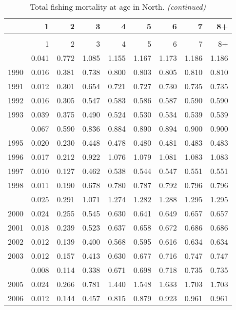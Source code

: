 \documentclass[
]{article}
\begin{document}
\begin{longtable}[t]{lrrrrrrrr}
\caption{\label{tab:North-region-FAA-table}Total fishing mortality at age in North.}\\
\toprule
  & 1 & 2 & 3 & 4 & 5 & 6 & 7 & 8+\\
\midrule
\endfirsthead
\caption[]{Total fishing mortality at age in North. \textit{(continued)}}\\
\toprule
  & 1 & 2 & 3 & 4 & 5 & 6 & 7 & 8+\\
\midrule
\endhead

\endfoot
\bottomrule
\endlastfoot
1989 & 0.041 & 0.772 & 1.085 & 1.155 & 1.167 & 1.173 & 1.186 & 1.186\\
1990 & 0.016 & 0.381 & 0.738 & 0.800 & 0.803 & 0.805 & 0.810 & 0.810\\
1991 & 0.012 & 0.301 & 0.654 & 0.721 & 0.727 & 0.730 & 0.735 & 0.735\\
1992 & 0.016 & 0.305 & 0.547 & 0.583 & 0.586 & 0.587 & 0.590 & 0.590\\
1993 & 0.039 & 0.375 & 0.490 & 0.524 & 0.530 & 0.534 & 0.539 & 0.539\\
\addlinespace
1994 & 0.067 & 0.590 & 0.836 & 0.884 & 0.890 & 0.894 & 0.900 & 0.900\\
1995 & 0.020 & 0.230 & 0.448 & 0.478 & 0.480 & 0.481 & 0.483 & 0.483\\
1996 & 0.017 & 0.212 & 0.922 & 1.076 & 1.079 & 1.081 & 1.083 & 1.083\\
1997 & 0.010 & 0.127 & 0.462 & 0.538 & 0.544 & 0.547 & 0.551 & 0.551\\
1998 & 0.011 & 0.190 & 0.678 & 0.780 & 0.787 & 0.792 & 0.796 & 0.796\\
\addlinespace
1999 & 0.025 & 0.291 & 1.071 & 1.274 & 1.282 & 1.288 & 1.295 & 1.295\\
2000 & 0.024 & 0.255 & 0.545 & 0.630 & 0.641 & 0.649 & 0.657 & 0.657\\
2001 & 0.018 & 0.239 & 0.523 & 0.637 & 0.658 & 0.672 & 0.686 & 0.686\\
2002 & 0.012 & 0.139 & 0.400 & 0.568 & 0.595 & 0.616 & 0.634 & 0.634\\
2003 & 0.012 & 0.157 & 0.413 & 0.630 & 0.677 & 0.716 & 0.747 & 0.747\\
\addlinespace
2004 & 0.008 & 0.114 & 0.338 & 0.671 & 0.698 & 0.718 & 0.735 & 0.735\\
2005 & 0.024 & 0.266 & 0.781 & 1.440 & 1.548 & 1.633 & 1.703 & 1.703\\
2006 & 0.012 & 0.144 & 0.457 & 0.815 & 0.879 & 0.923 & 0.961 & 0.961\\

\end{longtable}
\end{document}
